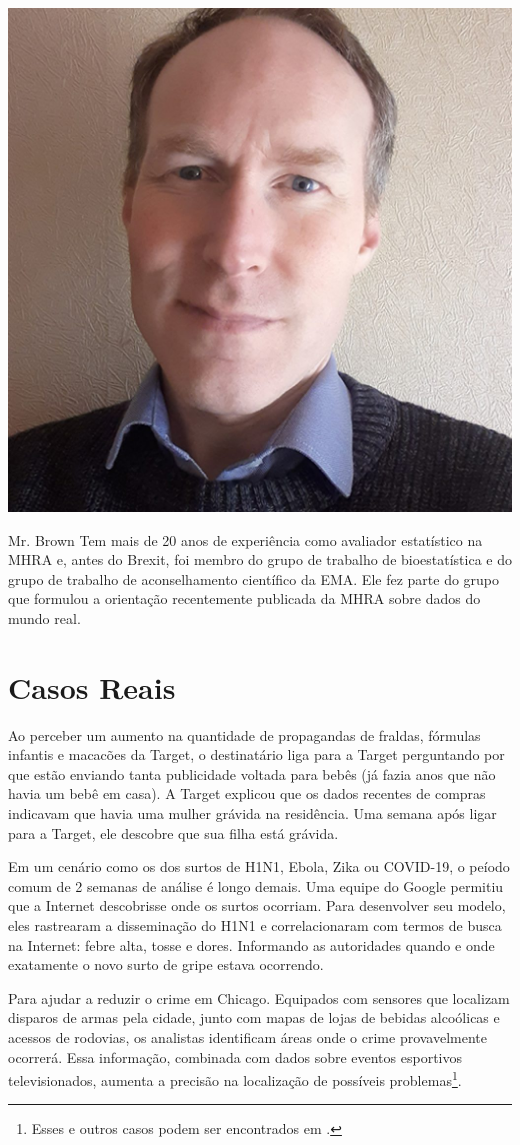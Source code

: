 \documentclass[article]{memoir}
\begin{document}
\begin{marginfigure}
	\centering
	\includegraphics[width=0.7\linewidth]{figs/mr_brown}
	\caption{Mr. Brown  Tem mais de 20 anos de experiência como avaliador estatístico na MHRA e, antes do Brexit, foi membro do grupo de trabalho de bioestatística e do grupo de trabalho de aconselhamento científico da EMA. Ele fez parte do grupo que formulou a orientação recentemente publicada da MHRA sobre dados do mundo real.}
	\label{fig:mrbrown}
\end{marginfigure}

\section{Casos Reais}
Ao perceber um aumento na quantidade de propagandas de fraldas, fórmulas infantis e macacões da Target, o destinatário liga para a Target perguntando por que estão enviando tanta publicidade voltada para bebês (já fazia anos que não havia um bebê em casa). A Target explicou que os dados recentes de compras indicavam que havia uma mulher grávida na residência. Uma semana após ligar para a Target, ele descobre que sua filha está grávida.

Em um cenário como os dos surtos de H1N1, Ebola, Zika ou COVID-19, o peíodo comum de 2 semanas de análise é longo demais. Uma equipe do Google permitiu que a Internet descobrisse onde os surtos ocorriam. Para desenvolver seu modelo, eles rastrearam a disseminação do H1N1 e correlacionaram com termos de busca na Internet: febre alta, tosse e dores. Informando as autoridades quando e onde exatamente o novo surto de gripe estava ocorrendo.

Para ajudar a reduzir o crime em Chicago. Equipados com sensores que localizam disparos de armas pela cidade, junto com mapas de lojas de bebidas alcoólicas e acessos de rodovias, os analistas identificam áreas onde o crime provavelmente ocorrerá. Essa informação, combinada com dados sobre eventos esportivos televisionados, aumenta a precisão na localização de possíveis problemas\footnote{Esses e outros casos podem ser encontrados em \cite{mayer2013big}.}. 
\end{document}
